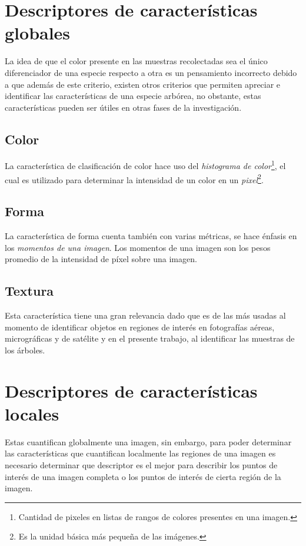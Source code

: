 \documentclass[a0,portrait]{a0poster}
\begin{document}
\begin{multicols}{2}
\section*{Descriptores de características globales}
La idea de que el color presente en las muestras recolectadas sea el único diferenciador de una especie respecto a otra es un pensamiento incorrecto debido a que además de este criterio, existen otros criterios que permiten apreciar e identificar las características de una especie arbórea, no obstante, estas características pueden ser útiles en otras fases de la investigación. 

\subsection*{Color}
La característica de clasificación de color hace uso del \emph{histograma de color}\footnote{Cantidad de pixeles en listas de rangos de colores presentes en una imagen.}, el cual es utilizado para determinar la intensidad de un color en un \emph{pixel}\footnote{Es la unidad básica más pequeña de las imágenes.}.

\subsection*{Forma}
La característica de forma cuenta también con varias métricas, se hace énfasis en los \emph{momentos de una imagen}. 
Los momentos de una imagen son los pesos promedio de la intensidad de píxel sobre una imagen.  


\subsection*{Textura} 
Esta característica tiene una gran relevancia dado que es de las más usadas al momento de identificar objetos en regiones de interés en fotografías aéreas, micrográficas y de satélite y en el presente trabajo, al identificar las muestras de los árboles.

\bigskip
\section*{Descriptores de características locales}
Estas cuantifican globalmente una imagen, sin embargo, para poder determinar las características que cuantifican localmente las regiones de una imagen es necesario determinar que descriptor es el mejor para describir los puntos de interés de una imagen completa o los puntos de interés de cierta región de la imagen. \\


\end{multicols}
\end{document}
